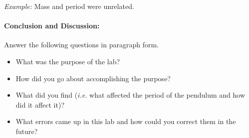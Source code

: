 \documentclass[10pt]{exam}
\begin{document}
  \emph{Example:} Mass and period were unrelated.

\paragraph{Conclusion and Discussion:}
  Answer the following questions in paragraph form.

  \begin{itemize}
    \item
      What was the purpose of the lab?
    \item
      How did you go about accomplishing the purpose?
    \item
      What did you find (\emph{i.e.} what affected the period of the
      pendulum and how did it affect it)?
    \item
      What errors came up in this lab and how could you correct them in the
      future?
  \end{itemize}
\end{document}
